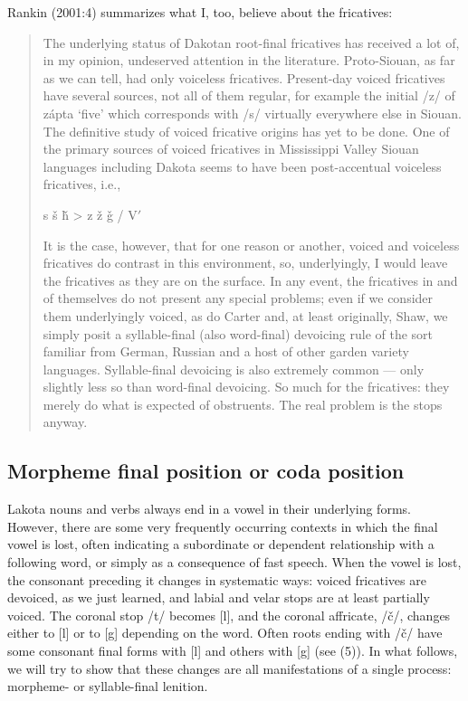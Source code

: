 \documentclass[output=paper]{LSP/langsci}
\begin{document}
Rankin (2001:4) summarizes what I, too, believe about the fricatives:

\begin{quote}The underlying status of Dakotan root-final fricatives has received a lot of, in my opinion, undeserved attention in the literature. Proto-Siouan, as far as we can tell, had only voiceless fricatives. Present-day voiced fricatives have several sources, not all of them regular, for example the initial /z/ of z\'apta `five' which corresponds with /s/ virtually everywhere else in Siouan. The definitive study of voiced fricative origins has yet to be done. One of the primary sources of voiced fricatives in Mississippi Valley Siouan languages including Dakota seems to have been post-accentual voiceless fricatives, i.e.,\vspace{-1em}
\begin{center}
s \v{s} \v{h} > z \v{z} \v{g} / V$'$  \underline{\hspace{1em}}
\end{center}
\vspace{-1em}
It is the case, however, that for one reason or another, voiced and voiceless fricatives do contrast in this environment, so, underlyingly, I would leave the fricatives as they are on the surface. In any event, the fricatives in and of themselves do not present any special problems; even if we consider them underlyingly voiced, as do Carter and, at least originally, Shaw, we simply posit a syllable-final (also word-final) devoicing rule of the sort familiar from German, Russian and a host of other garden variety languages. Syllable-final devoicing is also extremely common --- only slightly less so than word-final devoicing. So much for the fricatives: they merely do what is expected of obstruents. The real problem is the stops anyway.\end{quote}

\subsection{Morpheme final position or coda position}

Lakota nouns and verbs always end in a vowel in their underlying forms. However, there are some very frequently occurring contexts in which the final vowel is lost, often indicating a subordinate or dependent relationship with a following word, or simply as a consequence of fast speech. When the vowel is lost, the consonant preceding it changes in systematic ways: voiced fricatives are devoiced, as we just learned, and labial and velar stops are at least partially voiced. The coronal stop /t/ becomes [l], and the coronal affricate, /\v{c}/, changes either to [l] or to [g] depending on the word. Often roots ending with /\v{c}/ have some consonant final forms with [l] and others with [g] (see (5)). In what follows, we will try to show that these changes are all manifestations of a single process: morpheme- or syllable-final lenition.
\end{document}
